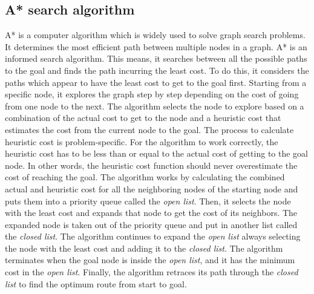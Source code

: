 
\subsection{A* search algorithm}
A* is a computer algorithm which is widely used to solve graph search problems. It determines the most efficient path between multiple nodes in a graph. A* is an informed search algorithm. This means, it searches between all the possible paths to the goal and finds the path incurring the least cost. To do this, it considers the paths which appear to have the least cost to get to the goal first. Starting from a specific node, it explores the graph step by step depending on the cost of going from one node to the next. The algorithm selects the node to explore based on a combination of the actual cost to get to the node and a heuristic cost that estimates the cost from the current node to the goal. The process to calculate heuristic cost is problem-specific. For the algorithm to work correctly, the heuristic cost has to be less than or equal to the actual cost of getting to the goal node. In other words, the heuristic cost function should never overestimate the cost of reaching the goal. The algorithm works by calculating the combined actual and heuristic cost for all the neighboring nodes of the starting node and puts them into a priority queue called the \textit{open list}. Then, it selects the node with the least cost and expands that node to get the cost of its neighbors. The expanded node is taken out of the priority queue and put in another list called the \textit{closed list}. The algorithm continues to expand the \textit{open list} always selecting the node with the least cost and adding it to the \textit{closed list}. The algorithm terminates when the goal node is inside the \textit{open list}, and it has the minimum cost in the \textit{open list}. Finally, the algorithm retraces its path through the \textit{closed list} to find the optimum route from start to goal. \cite{a8book} 


